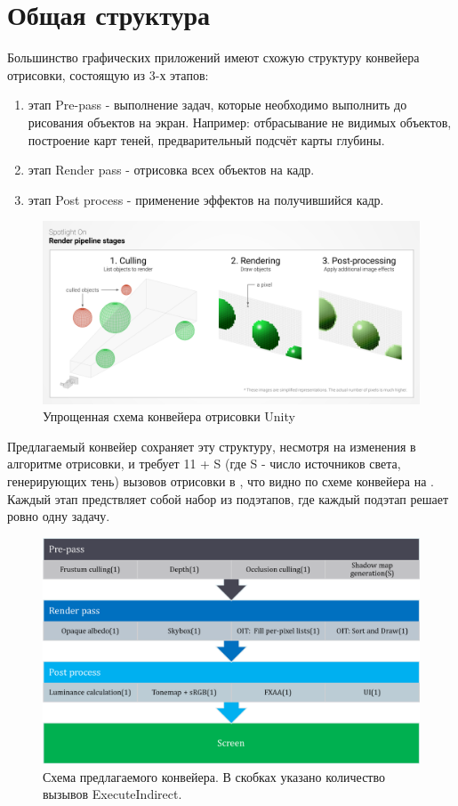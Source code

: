 \section{Общая структура} \label{ch3:pipeline_struct}
	Большинство графических приложений имеют схожую структуру конвейера отрисовки, состоящую из 3-х этапов:
	\begin{enumerate}[1.] 
		\item этап Pre-pass - выполнение задач, которые необходимо выполнить до рисования объектов на экран. Например: отбрасывание не видимых объектов, построение карт теней, предварительный подсчёт карты глубины.
		\item этап Render pass - отрисовка всех объектов на кадр.
		\item этап Post process - применение эффектов на получившийся кадр.
	\end{enumerate}
		
	\begin{figure}[ht!] 
		\center
		\includegraphics [scale=0.35] {my_folder/images//unity_pipeline}	
		\caption{Упрощенная схема конвейера отрисовки Unity} 
		\label{fig:unity_pipeline}  
	\end{figure}

	Предлагаемый конвейер сохраняет эту структуру, несмотря на изменения в алгоритме отрисовки, и требует 11 + S (где S - число источников света, генерирующих тень) вызовов отрисовки в , что видно по схеме конвейера на . Каждый этап предствляет собой набор из подэтапов, где каждый подэтап решает ровно одну задачу.
	
	\begin{figure}[ht!] 
		\center
		\includegraphics [scale=0.4] {my_folder/images//pipeline_schema}	
		\caption{Схема предлагаемого конвейера. В скобках указано количество вызывов ExecuteIndirect.} 
		\label{fig:pipeline_schema}  
	\end{figure}
	
	\FloatBarrier